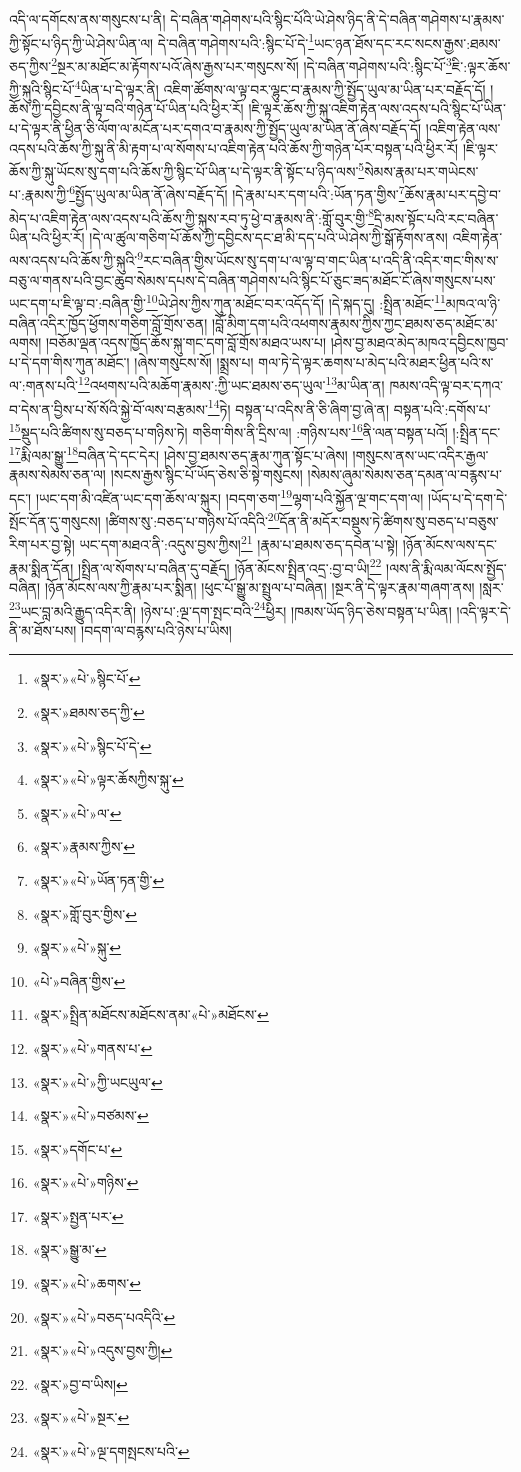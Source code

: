འདི་ལ་དགོངས་ནས་གསུངས་པ་ནི། དེ་བཞིན་གཤེགས་པའི་སྙིང་པོའི་ཡེ་ཤེས་ཉིད་ནི་དེ་བཞིན་གཤེགས་པ་རྣམས་ཀྱི་སྟོང་པ་ཉིད་ཀྱི་ཡེ་ཤེས་ཡིན་ལ། དེ་བཞིན་གཤེགས་པའི་:སྙིང་པོ་དེ་\footnote{«སྣར་»«པེ་»སྙིང་པོ་}ཡང་ཉན་ཐོས་དང་རང་སངས་རྒྱས་:ཐམས་ཅད་ཀྱིས་\footnote{«སྣར་»ཐམས་ཅད་ཀྱི་}སྔར་མ་མཐོང་མ་རྟོགས་པའོ་ཞེས་རྒྱས་པར་གསུངས་སོ། །དེ་བཞིན་གཤེགས་པའི་:སྙིང་པོ་\footnote{«སྣར་»«པེ་»སྙིང་པོ་དེ་}ཇི་:ལྟར་ཆོས་ཀྱི་སྐུའི་སྙིང་པོ་\footnote{«སྣར་»«པེ་»ལྟར་ཆོསཀྱིས་སྐུ་}ཡིན་པ་དེ་ལྟར་ནི། འཇིག་ཚོགས་ལ་ལྟ་བར་ལྷུང་བ་རྣམས་ཀྱི་སྤྱོད་ཡུལ་མ་ཡིན་པར་བརྗོད་དོ། །ཆོས་ཀྱི་དབྱིངས་ནི་ལྟ་བའི་གཉེན་པོ་ཡིན་པའི་ཕྱིར་རོ། །ཇི་ལྟར་ཆོས་ཀྱི་སྐུ་འཇིག་རྟེན་ལས་འདས་པའི་སྙིང་པོ་ཡིན་པ་དེ་ལྟར་ནི་ཕྱིན་ཅི་ལོག་ལ་མངོན་པར་དགའ་བ་རྣམས་ཀྱི་སྤྱོད་ཡུལ་མ་ཡིན་ནོ་ཞེས་བརྗོད་དོ། །འཇིག་རྟེན་ལས་འདས་པའི་ཆོས་ཀྱི་སྐུ་ནི་མི་རྟག་པ་ལ་སོགས་པ་འཇིག་རྟེན་པའི་ཆོས་ཀྱི་གཉེན་པོར་བསྟན་པའི་ཕྱིར་རོ། །ཇི་ལྟར་ཆོས་ཀྱི་སྐུ་ཡོངས་སུ་དག་པའི་ཆོས་ཀྱི་སྙིང་པོ་ཡིན་པ་དེ་ལྟར་ནི་སྟོང་པ་ཉིད་ལས་\footnote{«སྣར་»«པེ་»ལ་}སེམས་རྣམ་པར་གཡེངས་པ་:རྣམས་ཀྱི་\footnote{«སྣར་»རྣམས་ཀྱིས་}སྤྱོད་ཡུལ་མ་ཡིན་ནོ་ཞེས་བརྗོད་དོ། །དེ་རྣམ་པར་དག་པའི་:ཡོན་ཏན་གྱིས་\footnote{«སྣར་»«པེ་»ཡོན་ཏན་གྱི་}ཆོས་རྣམ་པར་དབྱེ་བ་མེད་པ་འཇིག་རྟེན་ལས་འདས་པའི་ཆོས་ཀྱི་སྐུས་རབ་ཏུ་ཕྱེ་བ་རྣམས་ནི་:གློ་བུར་གྱི་\footnote{«སྣར་»གློ་བུར་གྱིས་}དྲི་མས་སྟོང་པའི་རང་བཞིན་ཡིན་པའི་ཕྱིར་རོ། །དེ་ལ་ཚུལ་གཅིག་པོ་ཆོས་ཀྱི་དབྱིངས་དང་ཐ་མི་དད་པའི་ཡེ་ཤེས་ཀྱི་སྒོ་རྟོགས་ནས། འཇིག་རྟེན་ལས་འདས་པའི་ཆོས་ཀྱི་སྐུའི་\footnote{«སྣར་»«པེ་»སྐུ་}རང་བཞིན་གྱིས་ཡོངས་སུ་དག་པ་ལ་ལྟ་བ་གང་ཡིན་པ་འདི་ནི་འདིར་གང་གིས་ས་བཅུ་ལ་གནས་པའི་བྱང་ཆུབ་སེམས་དཔས་དེ་བཞིན་གཤེགས་པའི་སྙིང་པོ་ཅུང་ཟད་མཐོང་ངོ་ཞེས་གསུངས་པས་ཡང་དག་པ་ཇི་ལྟ་བ་:བཞིན་གྱི་\footnote{«པེ་»བཞིན་གྱིས་}ཡེ་ཤེས་ཀྱིས་ཀུན་མཐོང་བར་འདོད་དོ། །དེ་སྐད་དུ། :སྤྲིན་མཐོང་\footnote{«སྣར་»སྤྲིན་མཐོངས་མཐོངས་ནམ་«པེ་»མཐོངས་}མཁའ་ལ་ཉི་བཞིན་འདིར་ཁྱོད་ཕྱོགས་གཅིག་བློ་གྲོས་ཅན། །བློ་མིག་དག་པའི་འཕགས་རྣམས་ཀྱིས་ཀྱང་ཐམས་ཅད་མཐོང་མ་ལགས། །བཅོམ་ལྡན་འདས་ཁྱོད་ཆོས་སྐུ་གང་དག་བློ་གྲོས་མཐའ་ཡས་པ། །ཤེས་བྱ་མཐའ་མེད་མཁའ་དབྱིངས་ཁྱབ་པ་དེ་དག་གིས་ཀུན་མཐོང་། །ཞེས་གསུངས་སོ། །སྨྲས་པ། གལ་ཏེ་དེ་ལྟར་ཆགས་པ་མེད་པའི་མཐར་ཕྱིན་པའི་ས་ལ་:གནས་པའི་\footnote{«སྣར་»«པེ་»གནས་པ་}འཕགས་པའི་མཆོག་རྣམས་:ཀྱི་ཡང་ཐམས་ཅད་ཡུལ་\footnote{«སྣར་»«པེ་»ཀྱི་ཡངཡུལ་}མ་ཡིན་ན། ཁམས་འདི་ལྟ་བར་དཀའ་བ་དེས་ན་བྱིས་པ་སོ་སོའི་སྐྱེ་བོ་ལས་བརྩམས་\footnote{«སྣར་»«པེ་»བཙམས་}ཏེ། བསྟན་པ་འདིས་ནི་ཅི་ཞིག་བྱ་ཞེ་ན། བསྟན་པའི་:དགོས་པ་\footnote{«སྣར་»དགོང་པ་}སྡུད་པའི་ཚིགས་སུ་བཅད་པ་གཉིས་ཏེ། གཅིག་གིས་ནི་དྲིས་ལ། :གཉིས་པས་\footnote{«སྣར་»«པེ་»གཉིས་}ནི་ལན་བསྟན་པའོ། །:སྤྲིན་དང་\footnote{«སྣར་»སྤྱན་པར་}རྨི་ལམ་སྒྱུ་\footnote{«སྣར་»སྒྱུ་མ་}བཞིན་དེ་དང་དེར། །ཤེས་བྱ་ཐམས་ཅད་རྣམ་ཀུན་སྟོང་པ་ཞེས། །གསུངས་ནས་ཡང་འདིར་རྒྱལ་རྣམས་སེམས་ཅན་ལ། །སངས་རྒྱས་སྙིང་པོ་ཡོད་ཅེས་ཅི་སྟེ་གསུངས། །སེམས་ཞུམ་སེམས་ཅན་དམན་ལ་བརྙས་པ་དང་། །ཡང་དག་མི་འཛིན་ཡང་དག་ཆོས་ལ་སྐུར། །བདག་ཅག་\footnote{«སྣར་»«པེ་»ཆགས་}ལྷག་པའི་སྐྱོན་ལྔ་གང་དག་ལ། །ཡོད་པ་དེ་དག་དེ་སྤོང་དོན་དུ་གསུངས། །ཚིགས་སུ་:བཅད་པ་གཉིས་པོ་འདིའི་\footnote{«སྣར་»«པེ་»བཅད་པའདིའི་}དོན་ནི་མདོར་བསྡུས་ཏེ་ཚིགས་སུ་བཅད་པ་བཅུས་རིག་པར་བྱ་སྟེ། ཡང་དག་མཐའ་ནི་:འདུས་བྱས་ཀྱིས།\footnote{«སྣར་»«པེ་»འདུས་བྱས་ཀྱི།} །རྣམ་པ་ཐམས་ཅད་དབེན་པ་སྟེ། །ཉོན་མོངས་ལས་དང་རྣམ་སྨིན་དོན། །སྤྲིན་ལ་སོགས་པ་བཞིན་དུ་བརྗོད། །ཉོན་མོངས་སྤྲིན་འདྲ་:བྱ་བ་ཡི།\footnote{«སྣར་»བྱ་བ་ཡིས།} །ལས་ནི་རྨི་ལམ་ལོངས་སྤྱོད་བཞིན། །ཉོན་མོངས་ལས་ཀྱི་རྣམ་པར་སྨིན། །ཕུང་པོ་སྒྱུ་མ་སྤྲུལ་པ་བཞིན། །སྔར་ནི་དེ་ལྟར་རྣམ་གཞག་ནས། །སླར་\footnote{«སྣར་»«པེ་»སྔར་}ཡང་བླ་མའི་རྒྱུད་འདིར་ནི། །ཉེས་པ་:ལྔ་དག་སྤང་བའི་\footnote{«སྣར་»«པེ་»ལྔ་དགསྤངས་པའི་}ཕྱིར། །ཁམས་ཡོད་ཉིད་ཅེས་བསྟན་པ་ཡིན། །འདི་ལྟར་དེ་ནི་མ་ཐོས་པས། །བདག་ལ་བརྙས་པའི་ཉེས་པ་ཡིས། 